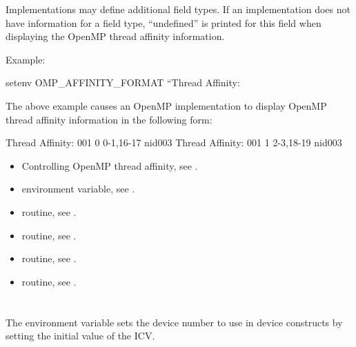 \linenumbers


Implementations may define additional field types.  If an implementation does not have information
for a field type, “undefined” is printed for this field when displaying the OpenMP thread affinity information.



Example: 
\begin{boxedcode}
setenv OMP\_AFFINITY\_FORMAT 
       “Thread Affinity: %
\end{boxedcode}

The above example causes an OpenMP implementation to display OpenMP thread affinity information in the following form:
\begin{boxedcode}
Thread Affinity: 001        0      0-1,16-17      nid003
Thread Affinity: 001        1      2-3,18-19      nid003
\end{boxedcode}

\crossreferences
\begin{itemize}
\item Controlling OpenMP thread affinity, see 
. 
\item {} environment variable, see 
.
\item {} routine, see .
\item {} routine, see .
\item {} routine, see .
\item {} routine, see .
\end{itemize}


\section{}
\label{sec:OMP_DEFAULT_DEVICE}
The  environment variable sets the device number to use in 
device constructs by setting the initial value of the  ICV.

